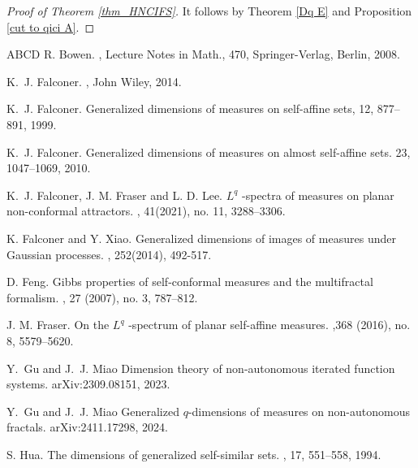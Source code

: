 \documentclass[12pt]{amsart}
\theoremstyle{plain}
\theoremstyle{definition}
\theoremstyle{remark}
\begin{document}
\begin{proof}[Proof of Theorem \ref{thm_HNCIFS}]
It  follows by Theorem \ref{Dq E} and Proposition \ref{cut to qici A}. 
\end{proof}





	\begin{thebibliography}{ABCD}
 R. Bowen.
,
\newblock Lecture Notes in Math., 470, Springer-Verlag, Berlin, 2008.

		 K.~J. Falconer.
		,
		\newblock John Wiley, 2014.
		
	
 K.~J. Falconer.
\newblock Generalized dimensions of measures on self-affine sets,
 12, 877--891,  1999.

 K.~J. Falconer.
\newblock Generalized dimensions of measures on almost self-affine sets.
 23, 1047--1069, 2010.





K.~J. Falconer, J. M. Fraser and L. D. Lee.
		\newblock  $L^q$ -spectra of measures on planar non-conformal attractors.
		, 41(2021), no. 11, 3288–3306.


K. Falconer and Y. Xiao.
		\newblock  Generalized dimensions of images of measures under Gaussian processes.
		, 252(2014), 492-517.

  D. Feng.
		\newblock Gibbs properties of self-conformal measures and the multifractal formalism.
		,  27 (2007), no. 3, 787–812.			

  J. M. Fraser.
		\newblock On the $L^q$ -spectrum of planar self-affine measures.
		,368 (2016), no. 8, 5579–5620.
		
		 Y.~Gu and J.~J. Miao
		\newblock Dimension theory of non-autonomous iterated function systems.
		\newblock arXiv:2309.08151, 2023.

 Y.~Gu and J.~J. Miao
		\newblock Generalized $q$-dimensions of measures on non-autonomous fractals.
		\newblock arXiv:2411.17298, 2024.

 S. Hua.
		\newblock The dimensions of generalized self-similar sets.
		, 17, 551--558, 1994.
		

\end{thebibliography}
\end{document}
